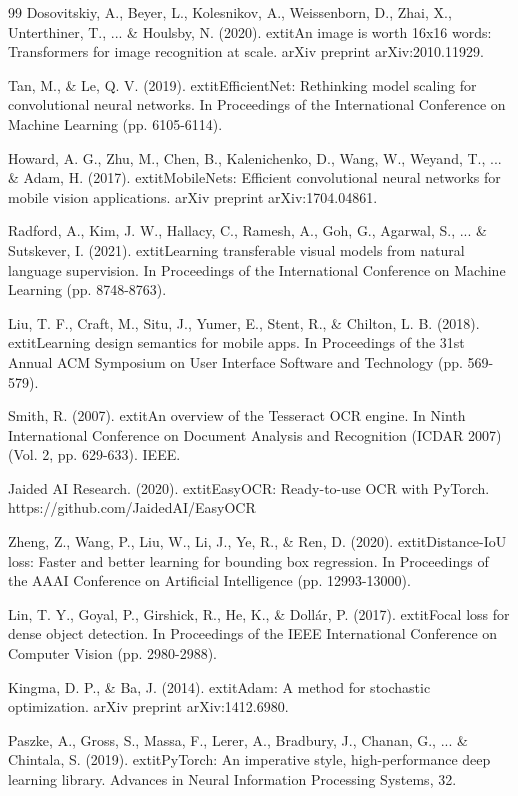 \documentclass[11pt,a4paper]{report}
\begin{document}
\begin{thebibliography}{99}
Dosovitskiy, A., Beyer, L., Kolesnikov, A., Weissenborn, D., Zhai, X., Unterthiner, T., ... \& Houlsby, N. (2020).
	extit{An image is worth 16x16 words: Transformers for image recognition at scale}.
arXiv preprint arXiv:2010.11929.

Tan, M., \& Le, Q. V. (2019).
	extit{EfficientNet: Rethinking model scaling for convolutional neural networks}.
In Proceedings of the International Conference on Machine Learning (pp. 6105-6114).

Howard, A. G., Zhu, M., Chen, B., Kalenichenko, D., Wang, W., Weyand, T., ... \& Adam, H. (2017).
	extit{MobileNets: Efficient convolutional neural networks for mobile vision applications}.
arXiv preprint arXiv:1704.04861.

Radford, A., Kim, J. W., Hallacy, C., Ramesh, A., Goh, G., Agarwal, S., ... \& Sutskever, I. (2021).
	extit{Learning transferable visual models from natural language supervision}.
In Proceedings of the International Conference on Machine Learning (pp. 8748-8763).

Liu, T. F., Craft, M., Situ, J., Yumer, E., Stent, R., \& Chilton, L. B. (2018).
	extit{Learning design semantics for mobile apps}.
In Proceedings of the 31st Annual ACM Symposium on User Interface Software and Technology (pp. 569-579).

Smith, R. (2007).
	extit{An overview of the Tesseract OCR engine}.
In Ninth International Conference on Document Analysis and Recognition (ICDAR 2007) (Vol. 2, pp. 629-633). IEEE.

Jaided AI Research. (2020).
	extit{EasyOCR: Ready-to-use OCR with PyTorch}.
https://github.com/JaidedAI/EasyOCR

Zheng, Z., Wang, P., Liu, W., Li, J., Ye, R., \& Ren, D. (2020).
	extit{Distance-IoU loss: Faster and better learning for bounding box regression}.
In Proceedings of the AAAI Conference on Artificial Intelligence (pp. 12993-13000).

Lin, T. Y., Goyal, P., Girshick, R., He, K., \& Dollár, P. (2017).
	extit{Focal loss for dense object detection}.
In Proceedings of the IEEE International Conference on Computer Vision (pp. 2980-2988).

Kingma, D. P., \& Ba, J. (2014).
	extit{Adam: A method for stochastic optimization}.
arXiv preprint arXiv:1412.6980.

Paszke, A., Gross, S., Massa, F., Lerer, A., Bradbury, J., Chanan, G., ... \& Chintala, S. (2019).
	extit{PyTorch: An imperative style, high-performance deep learning library}.
Advances in Neural Information Processing Systems, 32.


\end{thebibliography}
\end{document}
